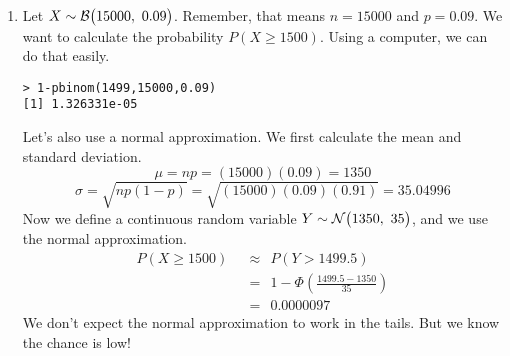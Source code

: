 \documentclass[12pt,letterpaper]{article}
\begin{document}
\begin{enumerate}
\item Let $X\sim \mathcal{B}\big(15000,~0.09\big)$. Remember, that means $n=15000$ and $p=0.09$. We want to calculate the probability $P(X \ge 1500)$. Using a computer, we can do that easily.
\begin{verbatim}
> 1-pbinom(1499,15000,0.09)
[1] 1.326331e-05
\end{verbatim}
Let's also use a normal approximation. We first calculate the mean and standard deviation.
$$\mu = np = (15000)(0.09) = 1350 $$
$$\sigma = \sqrt{np(1-p)} = \sqrt{(15000)(0.09)(0.91)} = 35.04996 $$
Now we define a continuous random variable $Y\sim \mathcal{N}\big(1350,~35\big)$, and we use the normal approximation.
\begin{align*}
P(X \ge 1500) ~~&\approx~~ P(Y > 1499.5)\\
 &=~~ 1-\Phi\left(\frac{1499.5-1350}{35} \right)\\
 &=~~ 0.0000097
\end{align*}
We don't expect the normal approximation to work in the tails. But we know the chance is low!



\end{enumerate}
\end{document}
